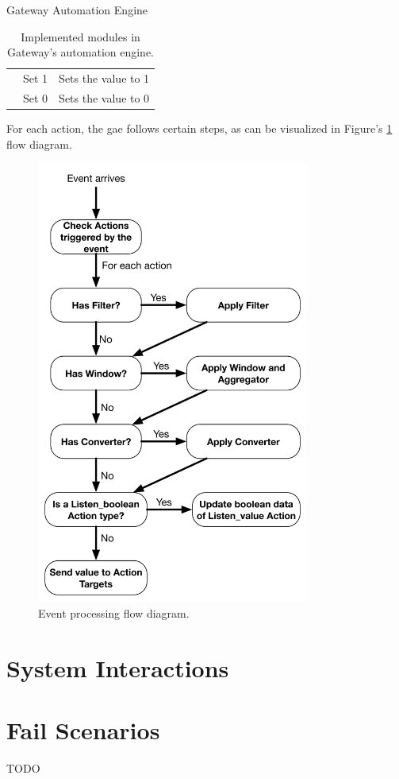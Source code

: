 \begin{Paragraph}{Gateway Automation Engine}
\begin{table}[H]
{\begin{tabular}{|c|c|l|}
		& Set 1                 & Sets the value to 1                                                                                                                                             \\ \cline{2-3} 
		& Set 0                 & Sets the value to 0                                                                                                                                             \\ \hline
	\end{tabular}}
	\centering
\caption{Implemented modules in Gateway's automation engine.}
\label{module-table}
\end{table}

For each action, the \ac{gae} follows certain steps, as can be visualized in Figure's \ref{fig:action} flow diagram.

\begin{figure}[H]
	\centering
	\includegraphics[width=0.8\textwidth]{figures/action.png}
	\caption{Event processing flow diagram.}
	\label{fig:action}
\end{figure}

\end{Paragraph}



\section{System Interactions}
\label{implementation:interactions}

\section{Fail Scenarios}
\label{implementation:scenarios}
TODO


